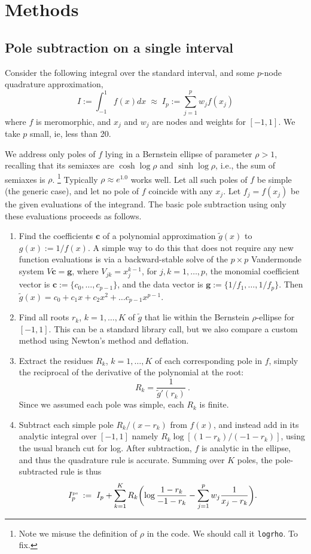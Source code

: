 \documentclass[11pt]{article}
\newcommand{\ben}{\begin{enumerate}}
\newcommand{\een}{\end{enumerate}}
\newcommand{\be}{\begin{equation}}
\newcommand{\ee}{\end{equation}}
\newcommand{\tbox}[1]{{\mbox{\tiny #1}}}
\newcommand{\mbf}[1]{{\mathbf #1}}
\begin{document}
\section{Methods}
\subsection{Pole subtraction on a single interval}

Consider the following integral over the standard interval,
and some $p$-node quadrature approximation,
\be
I := \int_{-1}^1 f(x) dx
\;\approx\;
I_p := \sum_{j=1}^p w_j f(x_j)
\label{I}
\ee
where $f$ is meromorphic, and $x_j$ and $w_j$ are nodes and weights for $[-1,1]$.
We take $p$ small, ie, less than 20.

We address only poles of $f$ lying in a Bernstein ellipse of parameter $\rho>1$,
recalling that its
semiaxes are $\cosh\log\rho$ and $\sinh\log\rho$,
i.e., the sum of semiaxes is $\rho$.
\footnote{Note we misuse the definition of $\rho$ in the code. We should call it {\tt logrho}. To fix.}
Typically $\rho \approx e^{1.0}$ works well.
Let all such poles of $f$ be simple (the generic case),
and let no pole of $f$ coincide with any $x_j$.
Let $f_j = f(x_j)$ be the given evaluations of the integrand.
The basic pole subtraction using only these evaluations proceeds as follows.
\ben
\item Find the coefficients $\mbf{c}$
  of a polynomial approximation $\tilde g(x)$ to $g(x) := 1/f(x)$.
  A simple way to do this that does not require any new function evaluations
  is via a backward-stable solve of the
  $p\times p$ Vandermonde system $V\mbf{c} = \mbf{g}$, where
  $V_{jk} = x_j^{k-1}$, for $j,k = 1,\dots,p$,
  the monomial coefficient vector is $\mbf{c} := \{c_0,\dots,c_{p-1}\}$,
  and the data vector is $\mbf{g} := \{1/f_1,\dots,1/f_p\}$.
  Then $\tilde g(x) = c_0 + c_1x + c_2 x^2 + \dots c_{p-1}x^{p-1}$.
\item
  Find all roots $r_k$, $k=1,\dots,K$
  of $\tilde g$ that lie within the Bernstein $\rho$-ellipse for $[-1,1]$.
  This can be a standard library call, but we also compare a custom method
  using Newton's method and deflation.
\item
  Extract the residues $R_k$, $k=1,\dots,K$ of each corresponding pole in $f$,
  simply the reciprocal of the derivative of the polynomial at the root:
  \be
  R_k = \frac{1}{\tilde g'(r_k)}~.
  \ee
  Since we assumed each pole was simple, each $R_k$ is finite.
\item Subtract each simple pole $R_k/(x-r_k)$ from $f(x)$, and instead
  add in its analytic integral over $[-1,1]$ namely $R_k \log[(1-r_k)/(-1-r_k)]$,
  using the usual branch cut for log.
  After subtraction, $f$ is analytic in the ellipse, and thus the quadrature
  rule is accurate.
  Summing over $K$ poles, the pole-subtracted rule is thus
  \be
  I^{\tbox{ps}}_p \;:=\;
  I_p +
  \sum_{k=1}^K R_k \biggl(
  \log\frac{1-r_k}{-1-r_k} -
  \sum_{j=1}^p w_j \frac{1}{x_j - r_k}
  \biggr).
  \label{ps}
  \ee
\een
\end{document}
